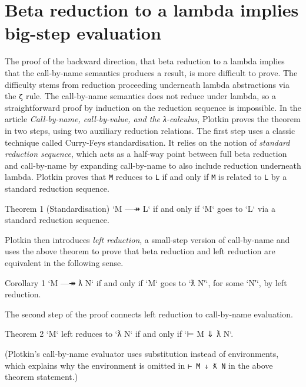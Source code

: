 \hypertarget{beta-reduction-to-a-lambda-implies-big-step-evaluation}{%
\section{Beta reduction to a lambda implies big-step
evaluation}\label{beta-reduction-to-a-lambda-implies-big-step-evaluation}}

The proof of the backward direction, that beta reduction to a lambda
implies that the call-by-name semantics produces a result, is more
difficult to prove. The difficulty stems from reduction proceeding
underneath lambda abstractions via the \texttt{ζ} rule. The call-by-name
semantics does not reduce under lambda, so a straightforward proof by
induction on the reduction sequence is impossible. In the article
\emph{Call-by-name, call-by-value, and the λ-calculus}, Plotkin proves
the theorem in two steps, using two auxiliary reduction relations. The
first step uses a classic technique called Curry-Feys standardisation.
It relies on the notion of \emph{standard reduction sequence}, which
acts as a half-way point between full beta reduction and call-by-name by
expanding call-by-name to also include reduction underneath lambda.
Plotkin proves that \texttt{M} reduces to \texttt{L} if and only if
\texttt{M} is related to \texttt{L} by a standard reduction sequence.

\begin{myDisplay}
Theorem 1 (Standardisation)
`M —↠ L` if and only if `M` goes to `L` via a standard reduction sequence.
\end{myDisplay}

Plotkin then introduces \emph{left reduction}, a small-step version of
call-by-name and uses the above theorem to prove that beta reduction and
left reduction are equivalent in the following sense.

\begin{myDisplay}
Corollary 1
`M —↠ ƛ N` if and only if `M` goes to `ƛ N′`, for some `N′`, by left reduction.
\end{myDisplay}

The second step of the proof connects left reduction to call-by-name
evaluation.

\begin{myDisplay}
Theorem 2
`M` left reduces to `ƛ N` if and only if `⊢ M ⇓ ƛ N`.
\end{myDisplay}

(Plotkin's call-by-name evaluator uses substitution instead of
environments, which explains why the environment is omitted in
\texttt{⊢\ M\ ⇓\ ƛ\ N} in the above theorem statement.)

